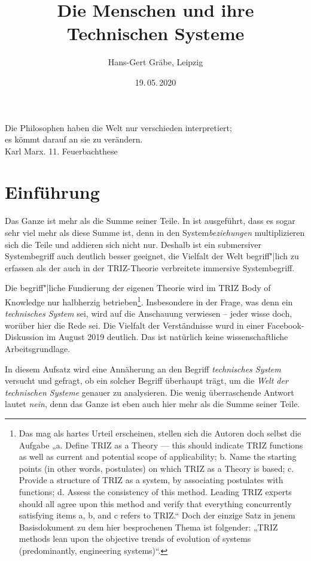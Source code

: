 \documentclass[12pt,a4paper]{article}
\title{Die Menschen und ihre Technischen Systeme}
\author{Hans-Gert Gräbe, Leipzig}
\date{19.\,05.\,2020}
\begin{document}
\maketitle

\begin{flushright}
  Die Philosophen haben die Welt nur verschieden interpretiert;\\ es kömmt
  darauf an sie zu verändern.\\ Karl Marx. 11. Feuerbachthese
\end{flushright}

\section{Einführung}

Das Ganze ist mehr als die Summe seiner Teile. In \cite{Graebe2020} ist
ausgeführt, dass es sogar sehr viel mehr als diese Summe ist, denn in den
System\emph{beziehungen} multiplizieren sich die Teile und addieren sich nicht
nur.  Deshalb ist ein submersiver Systembegriff auch deutlich besser geeignet,
die Vielfalt der Welt begriff"|lich zu erfassen als der auch in der
TRIZ-Theorie verbreitete immersive Systembegriff.

Die begriff"|liche Fundierung der eigenen Theorie wird im TRIZ Body of
Knowledge \cite{TBK-2007} nur halbherzig betrieben\footnote{Das mag als hartes
  Urteil erscheinen, stellen sich die Autoren doch selbst die Aufgabe „a.
  Define TRIZ as a Theory — this should indicate TRIZ functions as well as
  current and potential scope of applicability; b.  Name the starting points
  (in other words, postulates) on which TRIZ as a Theory is based; c.  Provide
  a structure of TRIZ as a system, by associating postulates with functions;
  d.  Assess the consistency of this method. Leading TRIZ experts should all
  agree upon this method and verify that everything concurrently satisfying
  items a, b, and c refers to TRIZ.“ Doch der einzige Satz in jenem
  Basisdokument zu dem hier besprochenen Thema ist folgender: „TRIZ methods
  lean upon the objective trends of evolution of systems (predominantly,
  engineering systems)“.}. Insbesondere in der Frage, was denn ein
\emph{technisches System} sei, wird auf die Anschauung verwiesen -- jeder
wisse doch, worüber hier die Rede sei. Die Vielfalt der Verständnisse wurd in
einer Facebook-Diskussion \cite{Graebe2019b} im August 2019 deutlich.  Das ist
natürlich keine wissenschaftliche Arbeitsgrundlage.

In diesem Aufsatz wird eine Annäherung an den Begriff \emph{technisches
  System} versucht und gefragt, ob ein solcher Begriff überhaupt trägt, um die
\emph{Welt der technischen Systeme} genauer zu analysieren.  Die wenig
überraschende Antwort lautet \emph{nein}, denn das Ganze ist eben auch hier
mehr als die Summe seiner Teile.
\end{document}
